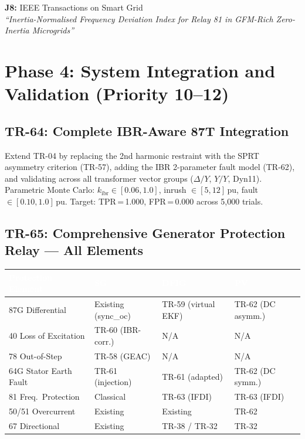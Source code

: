 \documentclass[12pt, a4paper]{report}
\begin{document}
\begin{tcolorbox}[pubbox, title={Publications — TR-63}]
\textbf{J8:} IEEE Transactions on Smart Grid\\
\textit{``Inertia-Normalised Frequency Deviation Index for Relay 81 in GFM-Rich Zero-Inertia Microgrids''}
\end{tcolorbox}

\chapter{Phase 4: System Integration and Validation (Priority 10--12)}

\section{TR-64: Complete IBR-Aware 87T Integration}

Extend TR-04 by replacing the 2nd harmonic restraint with the SPRT asymmetry criterion (TR-57), adding the IBR 2-parameter fault model (TR-62), and validating across all transformer vector groups ($\Delta/Y$, $Y/Y$, Dyn11). Parametric Monte Carlo: $k_\mathrm{ibr} \in [0.06, 1.0]$, inrush $\in [5, 12]$\,pu, fault $\in [0.10, 1.0]$\,pu. Target: TPR\,=\,1.000, FPR\,=\,0.000 across 5{,}000 trials.

\section{TR-65: Comprehensive Generator Protection Relay — All Elements}

\begin{center}
\renewcommand{\arraystretch}{1.3}
\begin{tabular}{L{3.5cm} C{3.0cm} C{3.0cm} C{3.0cm}}
\toprule
{}
\textcolor{white}{\textbf{Protection Element}} &
\textcolor{white}{\textbf{SG}} &
\textcolor{white}{\textbf{DFIG}} &
\textcolor{white}{\textbf{PV}} \\
\midrule
87G Differential & Existing (sync\_oc) & TR-59 (virtual EKF) & TR-62 (DC asymm.) \\
40 Loss of Excitation & TR-60 (IBR-corr.) & N/A & N/A \\
78 Out-of-Step & TR-58 (GEAC) & N/A & N/A \\
64G Stator Earth Fault & TR-61 (injection) & TR-61 (adapted) & TR-62 (DC symm.) \\
81 Freq.\ Protection & Classical & TR-63 (IFDI) & TR-63 (IFDI) \\
50/51 Overcurrent & Existing & Existing & TR-62 \\
67 Directional & Existing & TR-38 / TR-32 & TR-32 \\
\bottomrule
\end{tabular}
\end{center}
\end{document}
